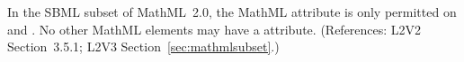 In the SBML subset of MathML~2.0, the MathML attribute
 is only permitted on 
and .  No other
MathML elements may have a  attribute.  (References:
L2V2 Section~3.5.1; L2V3 Section~\ref{sec:mathmlsubset}.)
